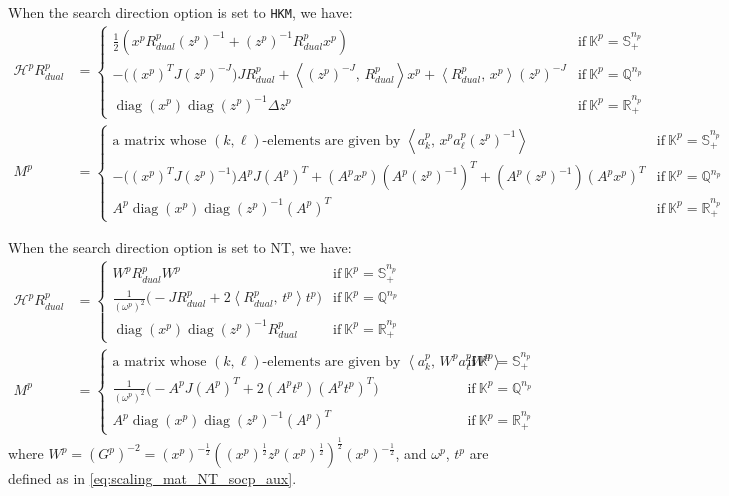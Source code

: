 \documentclass{scrartcl}
\newcommand{\inprod}[2]{\left\langle #1, \, #2 \right\rangle}
\begin{document}
When the search direction option is set to \texttt{HKM}, we have:
\begin{align}
    \mathcal{H}^p R^p_{dual} &= \begin{cases}
        \frac{1}{2}(x^p R^p_{dual} (z^p)^{-1} + (z^p)^{-1} R^p_{dual} x^p) & \text{if} ~ \mathbb{K}^p=\mathbb{S}^{n_p}_+\\
        - \Big( (x^p)^T J (z^p)^{-J} \Big) J R^p_{dual} + \inprod{(z^p)^{-J}}{R^p_{dual}} x^p + \inprod{R^p_{dual}}{x^p} (z^p)^{-J} & \text{if} ~ \mathbb{K}^p=\mathbb{Q}^{n_p}\\
        \operatorname{diag}(x^p) \operatorname{diag}(z^p)^{-1} \Delta z^p & \text{if} ~ \mathbb{K}^p=\mathbb{R}^{n_p}_+
    \end{cases} \label{eq:HKM_HRd}\\
    M^p &= \begin{cases} 
        \text{a matrix whose $(k,\ell)$-elements are given by } \inprod{a^p_k}{x^p a^p_\ell (z^p)^{-1}} & \text{if} ~ \mathbb{K}^p=\mathbb{S}^{n_p}_+ \\
        -\Big( (x^p)^T J (z^p)^{-1} \Big) A^p J (A^p)^T + (A^p x^p)(A^p (z^p)^{-1})^T + (A^p (z^p)^{-1})(A^p x^p)^T& \text{if} ~ \mathbb{K}^p=\mathbb{Q}^{n_p} \\
        A^p \operatorname{diag}(x^p) \operatorname{diag}(z^p)^{-1} (A^p)^T & \text{if} ~ \mathbb{K}^p=\mathbb{R}^{n_p}_+
    \end{cases}
\end{align}

When the search direction option is set to NT, we have:
\begin{align}
    \mathcal{H}^p R^p_{dual} &= \begin{cases}
        W^p R^p_{dual} W^p & \text{if} ~ \mathbb{K}^p=\mathbb{S}^{n_p}_+ \\
        \frac{1}{(\omega^p)^2} \Big(-J R^p_{dual} + 2\inprod{R^p_{dual}}{t^p}t^p\Big) & \text{if} ~ \mathbb{K}^p=\mathbb{Q}^{n_p}\\
        \operatorname{diag}(x^p) \operatorname{diag}(z^p)^{-1} R^p_{dual} & \text{if} ~ \mathbb{K}^p=\mathbb{R}^{n_p}_+
    \end{cases}\\
    M^p &= \begin{cases}
        \text{a matrix whose $(k,\ell)$-elements are given by } \inprod{a^p_k}{W^p a^p_\ell W^p} & \text{if} ~ \mathbb{K}^p=\mathbb{S}^{n_p}_+\\
        \frac{1}{(\omega^p)^2}\Big(-A^p J (A^p)^T + 2 (A^p t^p)(A^p t^p)^T \Big) & \text{if} ~ \mathbb{K}^p=\mathbb{Q}^{n_p} \\
        A^p \operatorname{diag}(x^p) \operatorname{diag}(z^p)^{-1} (A^p)^T & \text{if} ~ \mathbb{K}^p=\mathbb{R}^{n_p}_+
    \end{cases} \label{eq:NT_M}
\end{align}
where $W^p = (G^p)^{-2} = (x^p)^{-\frac{1}{2}}((x^p)^{\frac{1}{2}} z^p (x^p)^{\frac{1}{2}})^{\frac{1}{2}} (x^p)^{-\frac{1}{2}}$, and $\omega^p$, $t^p$ are defined as in \eqref{eq:scaling_mat_NT_socp_aux}.
\end{document}

